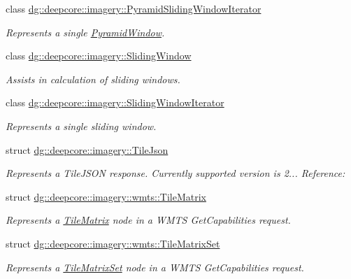 \begin{DoxyCompactItemize}
class \hyperlink{classdg_1_1deepcore_1_1imagery_1_1_pyramid_sliding_window_iterator}{dg\+::deepcore\+::imagery\+::\+Pyramid\+Sliding\+Window\+Iterator}
\begin{DoxyCompactList}\small\item\em Represents a single \hyperlink{structdg_1_1deepcore_1_1imagery_1_1_pyramid_window}{Pyramid\+Window}. \end{DoxyCompactList}\item 
class \hyperlink{classdg_1_1deepcore_1_1imagery_1_1_sliding_window}{dg\+::deepcore\+::imagery\+::\+Sliding\+Window}
\begin{DoxyCompactList}\small\item\em Assists in calculation of sliding windows. \end{DoxyCompactList}\item 
class \hyperlink{classdg_1_1deepcore_1_1imagery_1_1_sliding_window_iterator}{dg\+::deepcore\+::imagery\+::\+Sliding\+Window\+Iterator}
\begin{DoxyCompactList}\small\item\em Represents a single sliding window. \end{DoxyCompactList}\item 
struct \hyperlink{structdg_1_1deepcore_1_1imagery_1_1_tile_json}{dg\+::deepcore\+::imagery\+::\+Tile\+Json}
\begin{DoxyCompactList}\small\item\em Represents a Tile\+J\+S\+ON response. Currently supported version is 2... Reference\+: \href{https://github.com/mapbox/tilejson-spec/tree/master/2.0.0}{\tt } \end{DoxyCompactList}\item 
struct \hyperlink{structdg_1_1deepcore_1_1imagery_1_1wmts_1_1_tile_matrix}{dg\+::deepcore\+::imagery\+::wmts\+::\+Tile\+Matrix}
\begin{DoxyCompactList}\small\item\em Represents a \hyperlink{structdg_1_1deepcore_1_1imagery_1_1wmts_1_1_tile_matrix}{Tile\+Matrix} node in a W\+M\+TS Get\+Capabilities request. \end{DoxyCompactList}\item 
struct \hyperlink{structdg_1_1deepcore_1_1imagery_1_1wmts_1_1_tile_matrix_set}{dg\+::deepcore\+::imagery\+::wmts\+::\+Tile\+Matrix\+Set}
\begin{DoxyCompactList}\small\item\em Represents a \hyperlink{structdg_1_1deepcore_1_1imagery_1_1wmts_1_1_tile_matrix_set}{Tile\+Matrix\+Set} node in a W\+M\+TS Get\+Capabilities request. \end{DoxyCompactList}\item 

\end{DoxyCompactItemize}
